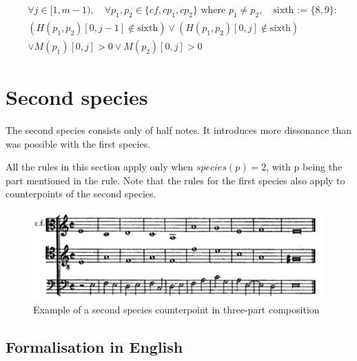    \begin{equation}
        \begin{aligned}
            & \forall j \in [1, m-1), \quad \forall p_1, p_2 \in \{\mathit{cf}, cp_1, cp_2\} \text{ where } p_1 \neq p_2, \quad \text{sixth := } \{8,9\} \colon \\
            & (H(p_1, p_2)[0, j-1] \notin \text{sixth}) \lor (H(p_1, p_2)[0, j] \notin \text{sixth}) \\
            & \lor M(p_1)[0, j] > 0 \lor M(p_2)[0, j] > 0
        \end{aligned}
        \end{equation}


\section{Second species}
The second species consists only of half notes. It introduces more dissonance than was possible with the first species. 

All the rules in this section apply only when $species(p) =2$, with p being the part mentioned in the rule. Note that the rules for the first species also apply to counterpoints of the second species.

\begin{figure}[h]
    \centering
    \includegraphics[width=1\textwidth]{Images/Species_examples/2sp-example.png}
    \caption{Example of a second species counterpoint in three-part composition}
    \label{fig:example-2sp}
\end{figure}
\subsection{Formalisation in English}\label{formalisation-en-2nd}
